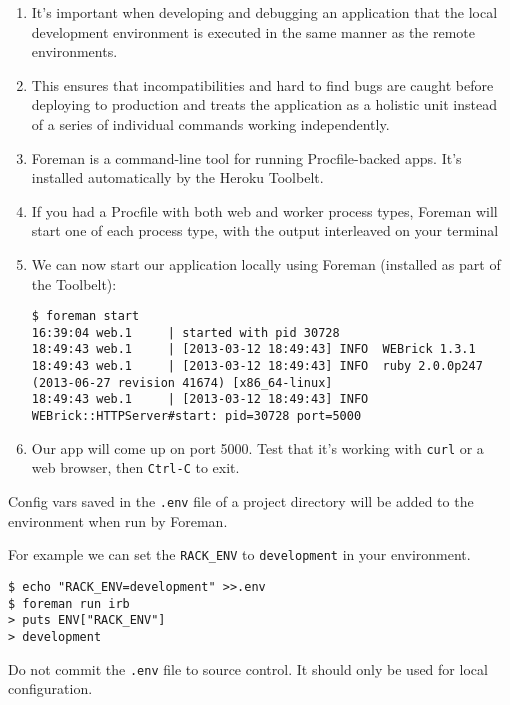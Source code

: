 \begin{enumerate}
\item 
It’s important when developing and debugging an application that
the local development environment is executed in the same manner
as the remote environments. 

\item 
This ensures that incompatibilities and
hard to find bugs are caught before deploying to production and
treats the application as a holistic unit instead of a series of
individual commands working independently.

\item 
Foreman is a command-line tool for running Procfile-backed apps.
It’s installed automatically by the Heroku Toolbelt.

\item 
If you had a Procfile with both web and worker process types, Foreman
will start one of each process type, with the output interleaved
on your terminal

\item 
We can now start our application locally using Foreman (installed as part of the Toolbelt):
\begin{verbatim}
$ foreman start
16:39:04 web.1     | started with pid 30728
18:49:43 web.1     | [2013-03-12 18:49:43] INFO  WEBrick 1.3.1
18:49:43 web.1     | [2013-03-12 18:49:43] INFO  ruby 2.0.0p247 (2013-06-27 revision 41674) [x86_64-linux]
18:49:43 web.1     | [2013-03-12 18:49:43] INFO  WEBrick::HTTPServer#start: pid=30728 port=5000
\end{verbatim}
\item 
Our app will come up on port 5000. Test that it’s working with 
\verb|curl|
or a web browser, then \verb|Ctrl-C| to exit.
\end{enumerate}


Config vars saved in the \verb|.env| file of a project directory will be
added to the environment when run by Foreman. 

For example we can
set the \verb|RACK_ENV| to \verb|development| in your environment.
\begin{verbatim}
$ echo "RACK_ENV=development" >>.env
$ foreman run irb
> puts ENV["RACK_ENV"]
> development
\end{verbatim}
Do not commit the \verb|.env| file to source control.
It should only be used for local configuration.



